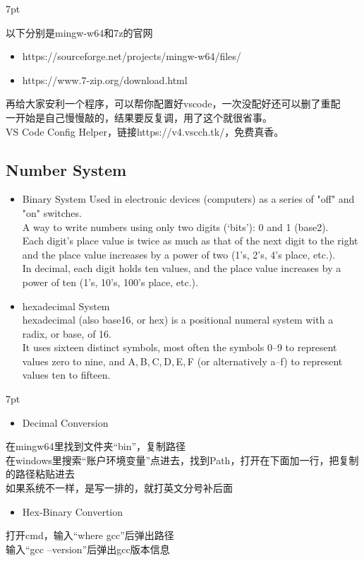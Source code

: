 \documentclass{book}
\newenvironment{formal2}{%
\def\FrameCommand{%
\hspace{1pt}%
{\color{Green}\vrule width 2pt}%
{\color{DarkSeaGreen1}\vrule width 4pt}%
\colorbox{greenshade}%
}%
\MakeFramed{\advance\hsize-\width\FrameRestore}%
\noindent\hspace{-4.55pt}%
\begin{adjustwidth}{}{7pt}%
\vspace{2pt}\vspace{2pt}%
}
{%
\vspace{2pt}\end{adjustwidth}\endMakeFramed%
}
\newenvironment{formal4}{%
\def\FrameCommand{%
\hspace{1pt}%
{\color{SkyBlue}\vrule width 2pt}%
{\color{Cyan1}\vrule width 4pt}%
\colorbox{LightCyan1}%
}%
\MakeFramed{\advance\hsize-\width\FrameRestore}%
\noindent\hspace{-4.55pt}%
\begin{adjustwidth}{}{7pt}%
\vspace{2pt}\vspace{2pt}%
}
{%
\vspace{2pt}\end{adjustwidth}\endMakeFramed%
}
\begin{document}
\begin{formal4}
以下分别是mingw-w64和7z的官网\\    
\begin{itemize}
\item https://sourceforge.net/projects/mingw-w64/files/
\item https://www.7-zip.org/download.html\\
\end{itemize}
再给大家安利一个程序，可以帮你配置好vscode，一次没配好还可以删了重配\\
一开始是自己慢慢敲的，结果要反复调，用了这个就很省事。\\
VS Code Config Helper，链接https://v4.vscch.tk/，免费真香。
\end{formal4}

\color{darkgray}
 \begin{shaded}
 {\subsection[short]{Number System}}
\end{shaded}
\color{black}
\begin{itemize}
    \item Binary System
    Used in electronic devices (computers) as a
    series of "off" and "on" switches.\\
    A way to write numbers using only two digits
    (‘bits’): 0 and 1 (base2).\\
    Each digit's place value is twice as much as
    that of the next digit to the right and the place
    value increases by a power of two (1's, 2's,
    4's place, etc.).\\
    In decimal, each digit holds ten values, and
    the place value increases by a power of ten
    (1's, 10's, 100's place, etc.).\\
    \item hexadecimal System\\
    hexadecimal (also base16, or hex) is a positional numeral
    system with a radix, or base, of 16.\\
    It uses sixteen distinct symbols, most often
    the symbols 0–9 to represent values zero to
    nine, and A, B, C, D, E, F (or alternatively a–f)
    to represent values ten to fifteen.
\end{itemize}
\begin{formal2}
\begin{itemize}
\item  Decimal Conversion
\end{itemize}
在mingw64里找到文件夹“bin”，复制路径\\
在windows里搜索“账户环境变量”点进去，找到Path，打开在下面加一行，把复制的路径粘贴进去\\
如果系统不一样，是写一排的，就打英文分号补后面\\
\begin{itemize}
\item Hex-Binary Convertion
\end{itemize}
打开cmd，输入“where gcc”后弹出路径\\
输入“gcc --version”后弹出gcc版本信息
\end{formal2}
\end{document}
